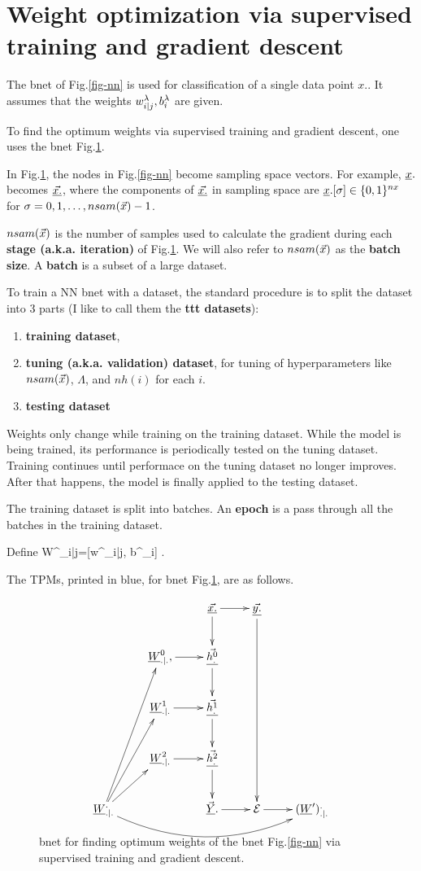 \section{Weight
optimization via
supervised training and
gradient descent}

The bnet of Fig.\ref{fig-nn}
is used for classification
of a single data point $x.$.
It assumes that the
weights $w^\lambda_{i|j}, b_i^\lambda$
are given.

To find the optimum
weights via supervised
training and gradient descent,
one uses the bnet Fig.\ref{fig-nn-ext}.

In Fig.\ref{fig-nn-ext},
the nodes in
Fig.\ref{fig-nn} become
sampling space vectors.
For example, ${\underline{x}}.$ becomes
$\underline{\vec{x.}}$, where the
components of
$\underline{\vec{x.}}$ in sampling space are
${\underline{x}}.[\sigma]\in \{0,1\}^{nx}$
for $\sigma=0, 1, \ldots, nsam({\vec{x}})-1$.


$nsam({\vec{x}})$
is the number of
samples used to calculate the
gradient
during each {\bf stage (a.k.a. iteration)} of
Fig.\ref{fig-nn-ext}.
We will also  refer to
$nsam({\vec{x}})$ as the {\bf batch size}.
A {\bf batch} is a subset of
a large dataset.



To train a NN bnet with a dataset,
the standard procedure
is to split the dataset into 3 parts
(I like to call them the {\bf ttt datasets}):
\begin{enumerate}
\item
{\bf training dataset},
\item
{\bf tuning (a.k.a. validation) dataset}, for
tuning
of hyperparameters
like $nsam({\vec{x}})$,  $\Lambda$,
and $nh(i)$
for each $i$.
\item
{\bf testing dataset}
\end{enumerate}

Weights only change while training on the training dataset.
While the model is being trained, its performance is periodically tested on the tuning dataset. Training continues until performace on the tuning dataset no longer improves. After that happens, the model is finally applied to the testing dataset.

The training dataset is
split into batches.
An {\bf epoch} is a pass through all
the batches in the training dataset.

Define
\beq
W^\lam_{i|j}=[w^\lam_{i|j}, b^\lam_i]
\;.
\eeq

The
TPMs,
printed in blue, for
 bnet
Fig.\ref{fig-nn-ext},
are as follows.

\begin{figure}[h!]
\centering
$$\xymatrix{
&&\ranvec{x.}\ar[d]\ar[r]&
\ranvec{y.}\ar[dddd]\\
&\rvW^0_{.|.}, \ar[r]&
\ranvec{h^0_.}\ar[d]\\
&\rvW^1_{.|.}\ar[r]&
\ranvec{h^1_.}\ar[d]\\
&\rvW^2_{.|.}\ar[r]&
\ranvec{h^2_.}\ar[d]\\
\rvW^._{.|.}\ar[ru]\ar[ruu]\ar[ruuu]
\ar@/_2pc/[rrrr]
&&
\vec{\rvY}.\ar[r]&\cale\ar[r]&
(\rvW')^._{.|.}
}$$
\caption{bnet
for
finding optimum
weights of the bnet
Fig.\ref{fig-nn} via
supervised training
and gradient descent.
}
\label{fig-nn-ext}
\end{figure}

